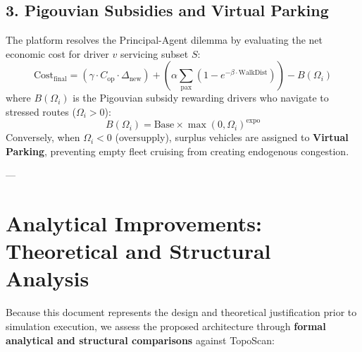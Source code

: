 \documentclass[12pt,a4paper]{article}
\begin{document}
\subsection{3. Pigouvian Subsidies and Virtual Parking}
The platform resolves the Principal-Agent dilemma by evaluating the net economic cost for driver $v$ servicing subset $S$:
\begin{equation}
\text{Cost}_{\text{final}} = \left( \gamma \cdot C_{\text{op}} \cdot \Delta_{\text{new}} \right) + \left( \alpha \sum_{\text{pax}} \left( 1 - e^{-\beta \cdot \text{WalkDist}} \right) \right) - B(\Omega_i)
\end{equation}
where $B(\Omega_i)$ is the Pigouvian subsidy rewarding drivers who navigate to stressed routes ($\Omega_i > 0$):
\begin{equation}
B(\Omega_i) = \text{Base} \times \max(0, \Omega_i)^{\text{expo}}
\end{equation}
Conversely, when $\Omega_i < 0$ (oversupply), surplus vehicles are assigned to \textbf{Virtual Parking}, preventing empty fleet cruising from creating endogenous congestion.

---

\section{Analytical Improvements: Theoretical and Structural Analysis}

Because this document represents the design and theoretical justification prior to simulation execution, we assess the proposed architecture through \textbf{formal analytical and structural comparisons} against TopoScan:
\end{document}

